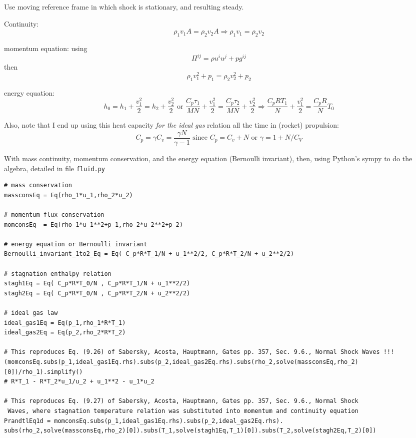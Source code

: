 \documentclass[twoside,landscape,10pt]{amsart}
\theoremstyle{plain}
\theoremstyle{definition}
\theoremstyle{remark}
\theoremstyle{remark}
\begin{document}
\begin{multicols*}{2}
Use moving reference frame in which shock is stationary, and resulting steady.




Continuity:
\[
\rho_1 v_1 A = \rho_2 v_2 A \Longrightarrow \rho_1 v_1 = \rho_2 v_2 
\]

momentum equation: using
\[
\Pi^{ij} = \rho u^i u^j + p g^{ij}
\]
then
\[
\rho_1 v_1^2 + p_1 = \rho_2 v_2^2 + p_2 
\]

energy equation:
\[
h_0 = h_1 + \frac{v_1^2}{2} = h_2 + \frac{v_2^2}{2} \text{ or } \frac{C_p \tau_1}{MN} + \frac{v_1^2}{2} = \frac{C_p\tau_2}{MN} + \frac{v_2^2}{2} \Longrightarrow \frac{C_p R T_1}{N} + \frac{v_1^2}{2} = \frac{C_pR}{N} T_0
\]

Also, note that I end up using this heat capacity \emph{ for the ideal gas } relation all the time in (rocket) propulsion:
\[
C_p = \gamma C_v = \frac{\gamma N}{\gamma -1}  \text{ since } C_p = C_v + N \text{ or } \gamma = 1 + N/C_V
\]

With mass continuity, momentum conservation, and the energy equation (Bernoulli invariant), then, using Python's sympy to do the algebra, detailed in file \verb|fluid.py|
\begin{lstlisting}
# mass conservation
massconsEq = Eq(rho_1*u_1,rho_2*u_2)

# momentum flux conservation
momconsEq  = Eq(rho_1*u_1**2+p_1,rho_2*u_2**2+p_2)

# energy equation or Bernoulli invariant
Bernoulli_invariant_1to2_Eq = Eq( C_p*R*T_1/N + u_1**2/2, C_p*R*T_2/N + u_2**2/2)

# stagnation enthalpy relation
stagh1Eq = Eq( C_p*R*T_0/N , C_p*R*T_1/N + u_1**2/2)
stagh2Eq = Eq( C_p*R*T_0/N , C_p*R*T_2/N + u_2**2/2)

# ideal gas law
ideal_gas1Eq = Eq(p_1,rho_1*R*T_1)
ideal_gas2Eq = Eq(p_2,rho_2*R*T_2)

# This reproduces Eq. (9.26) of Sabersky, Acosta, Hauptmann, Gates pp. 357, Sec. 9.6., Normal Shock Waves !!!
(momconsEq.subs(p_1,ideal_gas1Eq.rhs).subs(p_2,ideal_gas2Eq.rhs).subs(rho_2,solve(massconsEq,rho_2)[0])/rho_1).simplify()
# R*T_1 - R*T_2*u_1/u_2 + u_1**2 - u_1*u_2

# This reproduces Eq. (9.27) of Sabersky, Acosta, Hauptmann, Gates pp. 357, Sec. 9.6., Normal Shock
 Waves, where stagnation temperature relation was substituted into momentum and continuity equation
PrandtlEq1d = momconsEq.subs(p_1,ideal_gas1Eq.rhs).subs(p_2,ideal_gas2Eq.rhs).
subs(rho_2,solve(massconsEq,rho_2)[0]).subs(T_1,solve(stagh1Eq,T_1)[0]).subs(T_2,solve(stagh2Eq,T_2)[0])


\end{lstlisting}
\end{multicols*}
\end{document}

